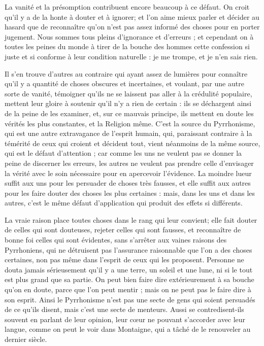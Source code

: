 La vanité et la présomption contribuent encore beaucoup à ce défaut. On croit qu'il y a de la honte à douter et à ignorer; et l'on aime mieux parler et décider au hasard que de reconnaître qu'on n'est pas assez informé des choses pour en porter jugement. Nous sommes tous pleins d'ignorance et d'erreurs ; et cependant on à toutes les peines du monde à tirer de la bouche des hommes cette confession si juste et si conforme à leur condition naturelle : je me trompe, et je n'en sais rien.

Il s'en trouve d'autres au contraire qui ayant assez de lumières pour connaître qu'il y a quantité de choses obscures et incertaines, et voulant, par une autre sorte de vanité, témoigner qu'ils ne se laissent pas aller à la crédulité populaire, mettent leur gloire à soutenir qu'il n'y a rien de certain : ils se déchargent ainsi de la peine de les examiner, et, sur ce mauvais principe, ils mettent en doute les vérités les plus constantes, et la Religion même. C'est la source du Pyrrhonisme, qui est une autre extravagance de l'esprit humain, qui, paraissant contraire à la témérité de ceux qui croient et décident tout, vient néanmoins de la même source, qui est le défaut d'attention ; car comme les uns ne veulent pas se donner la peine de discerner les erreurs, les autres ne veulent pas prendre celle d'envisager la vérité avec le soin nécessaire pour en apercevoir l'évidence. La moindre lueur suffit aux uns pour les persuader de choses très fausses, et elle suffit aux autres pour les faire douter des choses les plus certaines : mais, dans les uns et dans les autres, c'est le même défaut d'application qui produit des effets si différents.

La vraie raison place toutes choses dans le rang qui leur convient; elle fait douter de celles qui sont douteuses, rejeter celles qui sont fausses, et reconnaître de bonne foi celles qui sont évidentes, sans s'arrêter aux vaines raisons des Pyrrhoniens, qui ne détruisent pas l'assurance raisonnable que l'on a des choses certaines, non pas même dans l'esprit de ceux qui les proposent. Personne ne douta jamais sérieusement qu'il y a une terre, un soleil et une lune, ni si le tout est plus grand que sa partie. On peut bien faire dire extérieurement à sa bouche qu'on en doute, parce que l'on peut mentir ; mais on ne peut pas le faire dire à son esprit. Ainsi le Pyrrhonisme n'est pas une secte de gens qui soient persuadés de ce qu'ils disent, mais c'est une secte de menteurs. Aussi se contredisent-ils souvent en parlant de leur opinion, leur cœur ne pouvant s'accorder avec leur langue, comme on peut le voir dans Montaigne, qui a tâché de le renouveler au dernier siècle.

